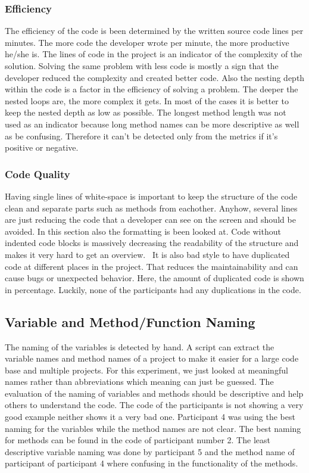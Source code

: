 \subsubsection{Efficiency}
The efficiency of the code is been determined by the written source code lines per minutes. The more code the developer wrote per minute, the more productive he/she is. 
The lines of code in the project is an indicator of the complexity of the solution. Solving the same problem with less code is mostly a sign that the developer reduced the complexity and created better code. 
Also the nesting depth within the code is a factor in the efficiency of solving a problem. The deeper the nested loops are, the more complex it gets. In most of the cases it is better to keep the nested depth as low as possible. 
The longest method length was not used as an indicator because long method names can be more descriptive as well as be confusing. Therefore it can't be detected only from the metrics if it's positive or negative. 

\subsubsection{Code Quality}
Having single lines of white-space is important to keep the structure of the code clean and separate parts such as methods from eachother. Anyhow, several lines are just reducing the code that a developer can see on the screen and should be avoided. 
In this section also the formatting is been looked at. Code without indented code blocks is massively decreasing the readability of the structure and makes it very hard to get an overview. 
\
It is also bad style to have duplicated code at different places in the project. That reduces the maintainability and can cause bugs or unexpected behavior. Here, the amount of duplicated code is shown in percentage. Luckily, none of the participants had any duplications in the code. 

\subsection{Variable and Method/Function Naming}
The naming of the variables is detected by hand. A script can extract the variable names and method names of a project to make it easier for a large code base and multiple projects. For this experiment, we just looked at meaningful names rather than abbreviations which meaning can just be guessed. 
The evaluation of the naming of variables and methods should be descriptive and help others to understand the code. The code of the participants is not showing a very good example neither shows it a very bad one. Participant 4 was using the best naming for the variables while the method names are not clear. The best naming for methods can be found in the code of participant number 2. 
The least descriptive variable naming was done by participant 5 and the method name of participant of participant 4 where confusing in the functionality of the methods.

